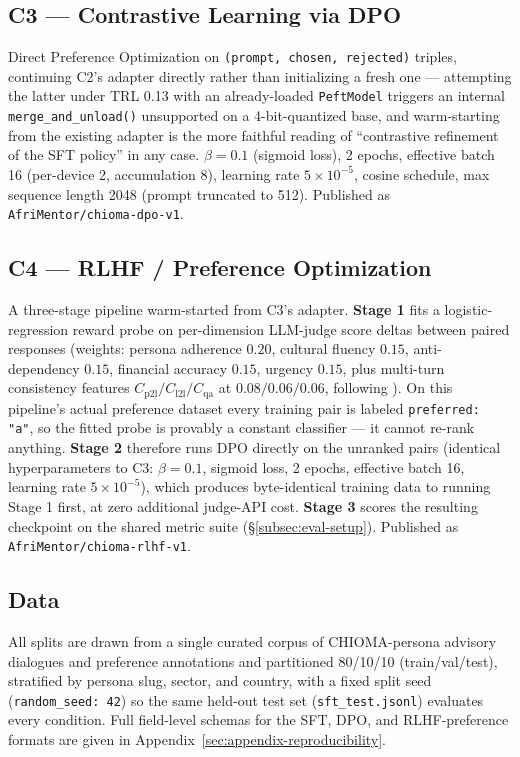 \subsection{C3 — Contrastive Learning via DPO}
\label{subsec:method-c3}
Direct Preference Optimization \citep{rafailov2023dpo} on \texttt{(prompt, chosen, rejected)} triples, continuing C2's adapter directly rather than initializing a fresh one — attempting the latter under TRL 0.13 with an already-loaded \texttt{PeftModel} triggers an internal \texttt{merge\_and\_unload()} unsupported on a 4-bit-quantized base, and warm-starting from the existing adapter is the more faithful reading of ``contrastive refinement of the SFT policy'' in any case. $\beta=0.1$ (sigmoid loss), 2 epochs, effective batch 16 (per-device 2, accumulation 8), learning rate $5\times10^{-5}$, cosine schedule, max sequence length 2048 (prompt truncated to 512). Published as \texttt{AfriMentor/chioma-dpo-v1}.

\subsection{C4 — RLHF / Preference Optimization}
\label{subsec:method-c4}
A three-stage pipeline warm-started from C3's adapter. \textbf{Stage 1} fits a logistic-regression reward probe on per-dimension LLM-judge score deltas between paired responses (weights: persona adherence $0.20$, cultural fluency $0.15$, anti-dependency $0.15$, financial accuracy $0.15$, urgency $0.15$, plus multi-turn consistency features $C_{\text{p2l}}/C_{\text{l2l}}/C_{\text{qa}}$ at $0.08/0.06/0.06$, following \citet{abdulhai2025personas}). On this pipeline's actual preference dataset every training pair is labeled \texttt{preferred: "a"}, so the fitted probe is provably a constant classifier — it cannot re-rank anything. \textbf{Stage 2} therefore runs DPO directly on the unranked pairs (identical hyperparameters to C3: $\beta=0.1$, sigmoid loss, 2 epochs, effective batch 16, learning rate $5\times10^{-5}$), which produces byte-identical training data to running Stage 1 first, at zero additional judge-API cost. \textbf{Stage 3} scores the resulting checkpoint on the shared metric suite (\S\ref{subsec:eval-setup}). Published as \texttt{AfriMentor/chioma-rlhf-v1}.

\subsection{Data}
\label{subsec:method-data}
All splits are drawn from a single curated corpus of CHIOMA-persona advisory dialogues and preference annotations and partitioned 80/10/10 (train/val/test), stratified by persona slug, sector, and country, with a fixed split seed (\texttt{random\_seed: 42}) so the same held-out test set (\texttt{sft\_test.jsonl}) evaluates every condition. Full field-level schemas for the SFT, DPO, and RLHF-preference formats are given in Appendix~\ref{sec:appendix-reproducibility}.
